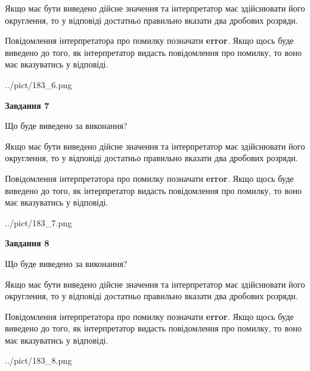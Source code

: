 \documentclass[12pt, ukrainian]{article}
\begin{document}
{\begin {Large}
Якщо має бути виведено дійсне значення та інтерпретатор має здійснювати його округлення, 
то у відповіді достатньо правильно вказати два дробових розряди.

Повідомлення інтерпретатора про помилку позначати \textbf{error}.
Якщо щось буде виведено до того, як інтерпретатор видасть повідомлення про помилку, 
то воно має вказуватись у відповіді. \par

\begin{center}
	{../pict/183_6.png}
\end{center}
\newpage

{\begin {center}\textbf{Завдання 7}\end {center}}\par
Що буде виведено за виконання? \par

Якщо має бути виведено дійсне значення та інтерпретатор має здійснювати його округлення, 
то у відповіді достатньо правильно вказати два дробових розряди.

Повідомлення інтерпретатора про помилку позначати \textbf{error}.
Якщо щось буде виведено до того, як інтерпретатор видасть повідомлення про помилку, 
то воно має вказуватись у відповіді. \par

\begin{center}
	{../pict/183_7.png}
\end{center}
\newpage

{\begin {center}\textbf{Завдання 8}\end {center}}\par
Що буде виведено за виконання? \par

Якщо має бути виведено дійсне значення та інтерпретатор має здійснювати його округлення, 
то у відповіді достатньо правильно вказати два дробових розряди.

Повідомлення інтерпретатора про помилку позначати \textbf{error}.
Якщо щось буде виведено до того, як інтерпретатор видасть повідомлення про помилку, 
то воно має вказуватись у відповіді. \par

\begin{center}
	{../pict/183_8.png}
\end{center}
\newpage


\end{Large}}
\end{document}
